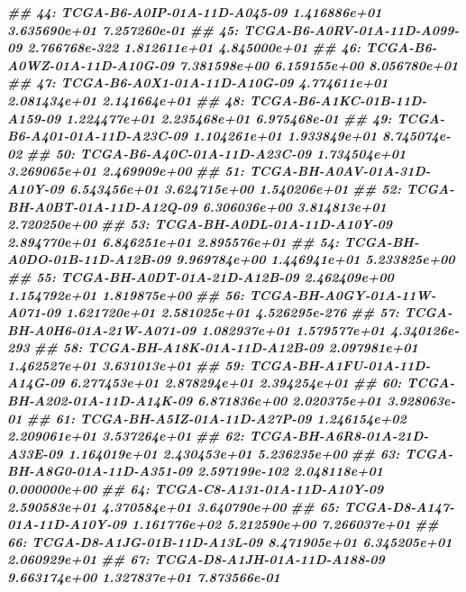 \documentclass[
  12pt,
  a4paper,
  twoside]{book}
\newenvironment{Shaded}{\begin{snugshade}}{\end{snugshade}}
\newcommand{\DocumentationTok}[1]{\textcolor[rgb]{0.56,0.35,0.01}{\textbf{\textit{#1}}}}
\begin{document}
\begin{Shaded}
\begin{Highlighting}[]
\DocumentationTok{\#\#  44: TCGA{-}B6{-}A0IP{-}01A{-}11D{-}A045{-}09  1.416886e+01  3.635690e+01  7.257260e{-}01}
\DocumentationTok{\#\#  45: TCGA{-}B6{-}A0RV{-}01A{-}11D{-}A099{-}09 2.766768e{-}322  1.812611e+01  4.845000e+01}
\DocumentationTok{\#\#  46: TCGA{-}B6{-}A0WZ{-}01A{-}11D{-}A10G{-}09  7.381598e+00  6.159155e+00  8.056780e+01}
\DocumentationTok{\#\#  47: TCGA{-}B6{-}A0X1{-}01A{-}11D{-}A10G{-}09  4.774611e+01  2.081434e+01  2.141664e+01}
\DocumentationTok{\#\#  48: TCGA{-}B6{-}A1KC{-}01B{-}11D{-}A159{-}09  1.224477e+01  2.235468e+01  6.975468e{-}01}
\DocumentationTok{\#\#  49: TCGA{-}B6{-}A401{-}01A{-}11D{-}A23C{-}09  1.104261e+01  1.933849e+01  8.745074e{-}02}
\DocumentationTok{\#\#  50: TCGA{-}B6{-}A40C{-}01A{-}11D{-}A23C{-}09  1.734504e+01  3.269065e+01  2.469909e+00}
\DocumentationTok{\#\#  51: TCGA{-}BH{-}A0AV{-}01A{-}31D{-}A10Y{-}09  6.543456e+01  3.624715e+00  1.540206e+01}
\DocumentationTok{\#\#  52: TCGA{-}BH{-}A0BT{-}01A{-}11D{-}A12Q{-}09  6.306036e+00  3.814813e+01  2.720250e+00}
\DocumentationTok{\#\#  53: TCGA{-}BH{-}A0DL{-}01A{-}11D{-}A10Y{-}09  2.894770e+01  6.846251e+01  2.895576e+01}
\DocumentationTok{\#\#  54: TCGA{-}BH{-}A0DO{-}01B{-}11D{-}A12B{-}09  9.969784e+00  1.446941e+01  5.233825e+00}
\DocumentationTok{\#\#  55: TCGA{-}BH{-}A0DT{-}01A{-}21D{-}A12B{-}09  2.462409e+00  1.154792e+01  1.819875e+00}
\DocumentationTok{\#\#  56: TCGA{-}BH{-}A0GY{-}01A{-}11W{-}A071{-}09  1.621720e+01  2.581025e+01 4.526295e{-}276}
\DocumentationTok{\#\#  57: TCGA{-}BH{-}A0H6{-}01A{-}21W{-}A071{-}09  1.082937e+01  1.579577e+01 4.340126e{-}293}
\DocumentationTok{\#\#  58: TCGA{-}BH{-}A18K{-}01A{-}11D{-}A12B{-}09  2.097981e+01  1.462527e+01  3.631013e+01}
\DocumentationTok{\#\#  59: TCGA{-}BH{-}A1FU{-}01A{-}11D{-}A14G{-}09  6.277453e+01  2.878294e+01  2.394254e+01}
\DocumentationTok{\#\#  60: TCGA{-}BH{-}A202{-}01A{-}11D{-}A14K{-}09  6.871836e+00  2.020375e+01  3.928063e{-}01}
\DocumentationTok{\#\#  61: TCGA{-}BH{-}A5IZ{-}01A{-}11D{-}A27P{-}09  1.246154e+02  2.209061e+01  3.537264e+01}
\DocumentationTok{\#\#  62: TCGA{-}BH{-}A6R8{-}01A{-}21D{-}A33E{-}09  1.164019e+01  2.430453e+01  5.236235e+00}
\DocumentationTok{\#\#  63: TCGA{-}BH{-}A8G0{-}01A{-}11D{-}A351{-}09 2.597199e{-}102  2.048118e+01  0.000000e+00}
\DocumentationTok{\#\#  64: TCGA{-}C8{-}A131{-}01A{-}11D{-}A10Y{-}09  2.590583e+01  4.370584e+01  3.640790e+00}
\DocumentationTok{\#\#  65: TCGA{-}D8{-}A147{-}01A{-}11D{-}A10Y{-}09  1.161776e+02  5.212590e+00  7.266037e+01}
\DocumentationTok{\#\#  66: TCGA{-}D8{-}A1JG{-}01B{-}11D{-}A13L{-}09  8.471905e+01  6.345205e+01  2.060929e+01}
\DocumentationTok{\#\#  67: TCGA{-}D8{-}A1JH{-}01A{-}11D{-}A188{-}09  9.663174e+00  1.327837e+01  7.873566e{-}01}

\end{Highlighting}
\end{Shaded}
\end{document}
